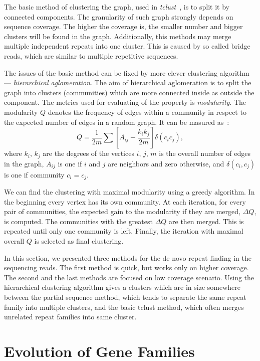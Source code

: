 The basic method of clustering the graph, used in \emph{tclust}~\cite{pertea2003tigr}, is to split it by connected components. The granularity of such graph strongly depends on sequence coverage. The higher the coverage is, the smaller number and bigger clusters will be found in the graph. Additionally, this methods may merge multiple independent repeats into one cluster. This is caused by so called bridge reads, which are similar to multiple repetitive sequences.

The issues of the basic method can be fixed by more clever clustering algorithm --- \emph{hierarchical aglomeration}. The aim of hierarchical aglomeration is to split the graph into clusters (communities) which are more connected inside as outside the component. The metrics used for evaluating of the property is \emph{modularity}.
The modularity $Q$ denotes the frequency of edges within a community in respect to the expected number of edges in a random graph. It can be masured as~\cite{novak2010graph}:
$$Q = \frac{1}{2m}\sum\left[A_{ij}-\frac{k_i k_j}{2m}\right] \delta(c_i c_j),$$
where $k_i,\, k_j$ are the degrees of the vertices $i,\,j$, $m$ is the overall number of edges in the graph, $A_{ij}$ is one if $i$ and $j$ are neighbors and zero otherwise, and $\delta(c_i, c_j)$ is one if community $c_i = c_j$.

We can find the clustering with maximal modularity using a greedy algorithm. In the beginning every vertex has its own community.
At each iteration, for every pair of communities, the expected gain to the modularity if they are merged, $\Delta Q$, is computed. The communities with the greatest $\Delta Q$ are then merged. This is repeated until only one community is left. Finally, the iteration with maximal overall $Q$ is selected as final clustering.

In this section, we presented three methods for the de novo repeat finding in the sequencing reads. The first method is quick, but works only on higher coverage. The second and the last methods are focused on low coverage scenario. Using the hierarchical clustering algorithm gives a clusters which are in size somewhere between the partial sequence method, which tends to separate the same repeat family into multiple clusters, and the basic tclust method, which often merges unrelated repeat families into same cluster.

\section{Evolution of Gene Families}

